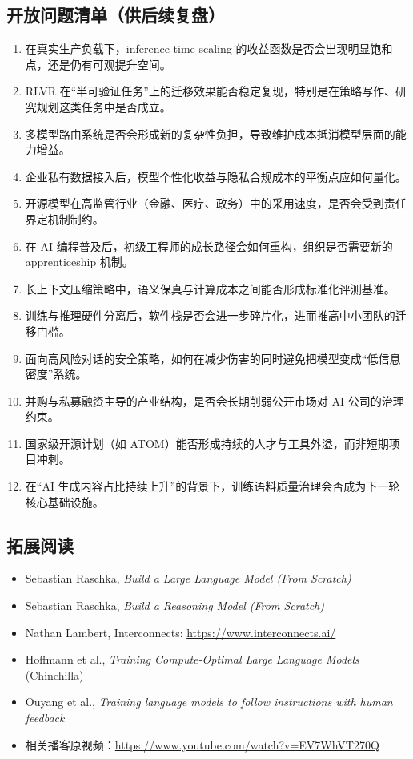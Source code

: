 \subsection{开放问题清单（供后续复盘）}

\begin{enumerate}[leftmargin=1.8em]
    \item 在真实生产负载下，inference-time scaling 的收益函数是否会出现明显饱和点，还是仍有可观提升空间。
    \item RLVR 在“半可验证任务”上的迁移效果能否稳定复现，特别是在策略写作、研究规划这类任务中是否成立。
    \item 多模型路由系统是否会形成新的复杂性负担，导致维护成本抵消模型层面的能力增益。
    \item 企业私有数据接入后，模型个性化收益与隐私合规成本的平衡点应如何量化。
    \item 开源模型在高监管行业（金融、医疗、政务）中的采用速度，是否会受到责任界定机制制约。
    \item 在 AI 编程普及后，初级工程师的成长路径会如何重构，组织是否需要新的 apprenticeship 机制。
    \item 长上下文压缩策略中，语义保真与计算成本之间能否形成标准化评测基准。
    \item 训练与推理硬件分离后，软件栈是否会进一步碎片化，进而推高中小团队的迁移门槛。
    \item 面向高风险对话的安全策略，如何在减少伤害的同时避免把模型变成“低信息密度”系统。
    \item 并购与私募融资主导的产业结构，是否会长期削弱公开市场对 AI 公司的治理约束。
    \item 国家级开源计划（如 ATOM）能否形成持续的人才与工具外溢，而非短期项目冲刺。
    \item 在“AI 生成内容占比持续上升”的背景下，训练语料质量治理会否成为下一轮核心基础设施。
\end{enumerate}

\subsection{拓展阅读}

\begin{itemize}[leftmargin=1.5em]
    \item Sebastian Raschka, \textit{Build a Large Language Model (From Scratch)}
    \item Sebastian Raschka, \textit{Build a Reasoning Model (From Scratch)}
    \item Nathan Lambert, Interconnects: \url{https://www.interconnects.ai/}
    \item Hoffmann et al., \textit{Training Compute-Optimal Large Language Models} (Chinchilla)
    \item Ouyang et al., \textit{Training language models to follow instructions with human feedback}
    \item 相关播客原视频：\url{https://www.youtube.com/watch?v=EV7WhVT270Q}
\end{itemize}


